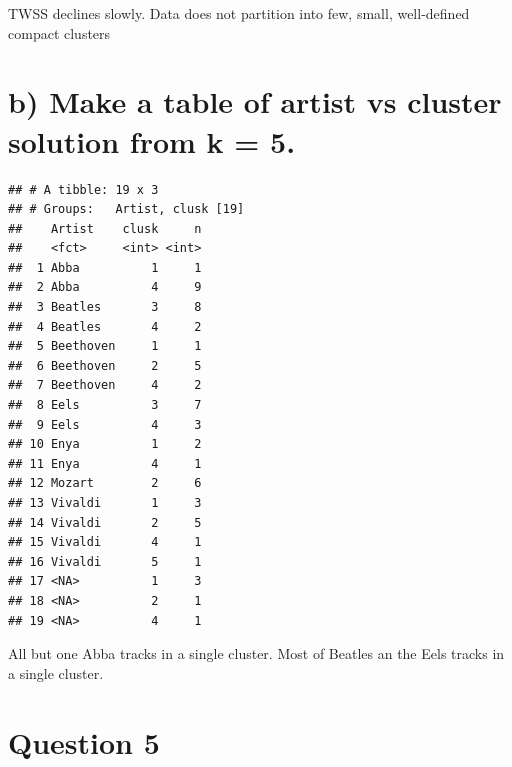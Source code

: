 \documentclass[]{article}
\newenvironment{Shaded}{\begin{snugshade}}{\end{snugshade}}
\newcommand{\DataTypeTok}[1]{\textcolor[rgb]{0.13,0.29,0.53}{#1}}
\newcommand{\DecValTok}[1]{\textcolor[rgb]{0.00,0.00,0.81}{#1}}
\newcommand{\KeywordTok}[1]{\textcolor[rgb]{0.13,0.29,0.53}{\textbf{#1}}}
\newcommand{\NormalTok}[1]{#1}
\newcommand{\OperatorTok}[1]{\textcolor[rgb]{0.81,0.36,0.00}{\textbf{#1}}}
\newcommand{\StringTok}[1]{\textcolor[rgb]{0.31,0.60,0.02}{#1}}
\begin{document}
TWSS declines slowly. Data does not partition into few, small,
well-defined compact clusters

\hypertarget{b-make-a-table-of-artist-vs-cluster-solution-from-k-5.}{%
\section{b) Make a table of artist vs cluster solution from k =
5.}\label{b-make-a-table-of-artist-vs-cluster-solution-from-k-5.}}

\begin{Shaded}
\end{Shaded}

\begin{verbatim}
## # A tibble: 19 x 3
## # Groups:   Artist, clusk [19]
##    Artist    clusk     n
##    <fct>     <int> <int>
##  1 Abba          1     1
##  2 Abba          4     9
##  3 Beatles       3     8
##  4 Beatles       4     2
##  5 Beethoven     1     1
##  6 Beethoven     2     5
##  7 Beethoven     4     2
##  8 Eels          3     7
##  9 Eels          4     3
## 10 Enya          1     2
## 11 Enya          4     1
## 12 Mozart        2     6
## 13 Vivaldi       1     3
## 14 Vivaldi       2     5
## 15 Vivaldi       4     1
## 16 Vivaldi       5     1
## 17 <NA>          1     3
## 18 <NA>          2     1
## 19 <NA>          4     1
\end{verbatim}

All but one Abba tracks in a single cluster. Most of Beatles an the Eels
tracks in a single cluster.

\newpage

\hypertarget{question-5}{%
\section{Question 5}\label{question-5}}
\end{document}
